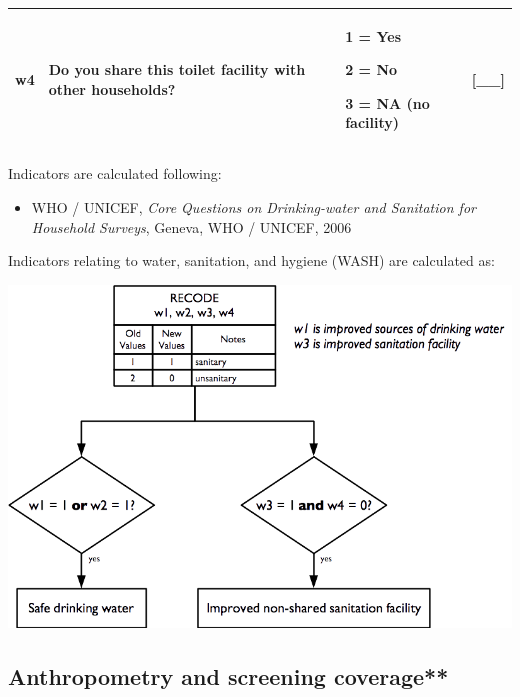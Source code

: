 \documentclass[12pt,a4paper]{book}
\providecommand{\tightlist}{%
  \setlength{\itemsep}{0pt}\setlength{\parskip}{0pt}}
\theoremstyle{definition}
\theoremstyle{definition}
\theoremstyle{definition}
\theoremstyle{remark}
\begin{document}
\begin{longtable}[]{@{}llll@{}}
\toprule
\begin{minipage}[t]{0.24\columnwidth}\raggedright
w4\strut
\end{minipage} & \begin{minipage}[t]{0.24\columnwidth}\raggedright
Do you share this toilet facility with other households?\strut
\end{minipage} & \begin{minipage}[t]{0.24\columnwidth}\raggedright
1 = Yes

2 = No

3 = NA (no facility)\strut
\end{minipage} & \begin{minipage}[t]{0.24\columnwidth}\raggedright
{[}\_\_{]}\strut
\end{minipage}\tabularnewline
\bottomrule
\end{longtable}

Indicators are calculated following:

\begin{itemize}
\tightlist
\item
  WHO / UNICEF, \emph{Core Questions on Drinking-water and Sanitation
  for Household Surveys}, Geneva, WHO / UNICEF, 2006
\end{itemize}

Indicators relating to water, sanitation, and hygiene (WASH) are
calculated as:

\begin{center}\includegraphics[width=800pt]{figures/indicators24} \end{center}

\hypertarget{anthropometry-and-screening-coverage}{%
\subsection{Anthropometry and screening
coverage**}\label{anthropometry-and-screening-coverage}}
\end{document}
